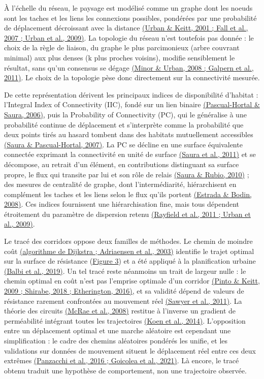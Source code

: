 \documentclass[a4paper,11pt]{report}
\begin{document}
À l'échelle du réseau, le paysage est modélisé comme un graphe dont les noeuds sont les taches et les liens les connexions possibles, pondérées par une probabilité de déplacement décroissant avec la distance \hyperref[sec:bibliographie]{(Urban \& Keitt, 2001 ; Fall et al., 2007 ; Urban et al., 2009)}. La topologie du réseau n'est toutefois pas donnée : le choix de la règle de liaison, du graphe le plus parcimonieux (arbre couvrant minimal) aux plus denses (k plus proches voisins), modifie sensiblement le résultat, sans qu'un consensus se dégage \hyperref[sec:bibliographie]{(Minor \& Urban, 2008 ; Galpern et al., 2011)}. Le choix de la topologie pèse donc directement sur la connectivité mesurée.

De cette représentation dérivent les principaux indices de disponibilité d'habitat : l'Integral Index of Connectivity (IIC), fondé sur un lien binaire \hyperref[sec:bibliographie]{(Pascual-Hortal \& Saura, 2006)}, puis la Probability of Connectivity (PC), qui le généralise à une probabilité continue de déplacement et s'interprète comme la probabilité que deux points tirés au hasard tombent dans des habitats mutuellement accessibles \hyperref[sec:bibliographie]{(Saura \& Pascual-Hortal, 2007)}. La PC se décline en une surface équivalente connectée exprimant la connectivité en unité de surface \hyperref[sec:bibliographie]{(Saura et al., 2011)} et se décompose, au retrait d'un élément, en contributions distinguant sa surface propre, le flux qui transite par lui et son rôle de relais \hyperref[sec:bibliographie]{(Saura \& Rubio, 2010)} ; des mesures de centralité de graphe, dont l'intermédiarité, hiérarchisent en complément les taches et les liens selon le flux qu'ils portent \hyperref[sec:bibliographie]{(Estrada \& Bodin, 2008)}. Ces indices fournissent une hiérarchisation fine, mais tous dépendent étroitement du paramètre de dispersion retenu \hyperref[sec:bibliographie]{(Rayfield et al., 2011 ; Urban et al., 2009)}.

Le tracé des corridors oppose deux familles de méthodes. Le chemin de moindre coût \hyperref[sec:bibliographie]{(algorithme de Dijkstra ; Adriaensen et al., 2003)} identifie le trajet optimal sur la surface de résistance (\hyperref[fig:3]{Figure 3}) et a été appliqué à la planification urbaine \hyperref[sec:bibliographie]{(Balbi et al., 2019)}. Un tel tracé reste néanmoins un trait de largeur nulle : le chemin optimal en coût n'est pas l'emprise optimale d'un corridor \hyperref[sec:bibliographie]{(Pinto \& Keitt, 2009 ; Shirabe, 2018 ; Etherington, 2016)}, et sa validité dépend de valeurs de résistance rarement confrontées au mouvement réel \hyperref[sec:bibliographie]{(Sawyer et al., 2011)}. La théorie des circuits \hyperref[sec:bibliographie]{(McRae et al., 2008)} restitue à l'inverse un gradient de perméabilité intégrant toutes les trajectoires \hyperref[sec:bibliographie]{(Koen et al., 2014)}. L'opposition entre un déplacement optimal et une marche aléatoire est cependant une simplification : le cadre des chemins aléatoires pondérés les unifie, et les validations sur données de mouvement situent le déplacement réel entre ces deux extrêmes \hyperref[sec:bibliographie]{(Panzacchi et al., 2016 ; Goicolea et al., 2021)}. Là encore, le tracé obtenu traduit une hypothèse de comportement, non une trajectoire observée.
\end{document}
